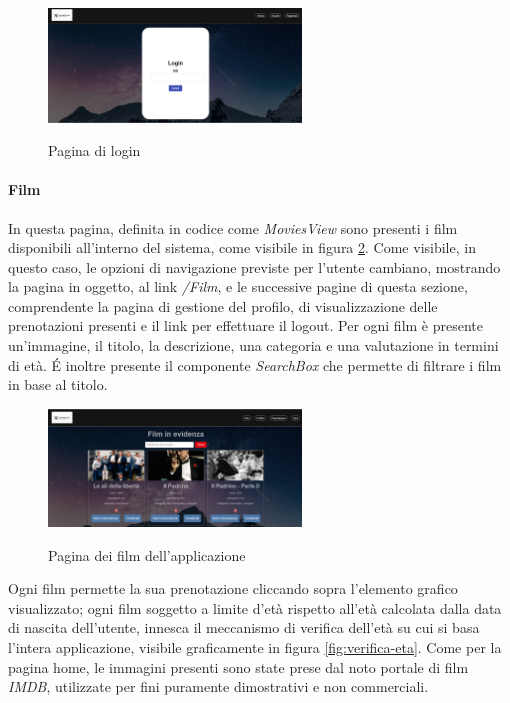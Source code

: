 \begin{figure}[h]
    \centering
    \includegraphics[width=0.6\textwidth, alt={Pagina di accesso all'applicazione}]{immagini/frontend/login.png}
    \caption{Pagina di login}\label{fig:pagina-login}
\end{figure}

\paragraph{Film}

In questa pagina, definita in codice come \textit{MoviesView} sono presenti i film disponibili all'interno del sistema, come visibile in figura \ref{fig:pagina-film}.
Come visibile, in questo caso, le opzioni di navigazione previste per l'utente cambiano, mostrando la pagina in oggetto, al link \textit{/Film},
e le successive pagine di questa sezione, comprendente la pagina di gestione del profilo, di visualizzazione delle prenotazioni presenti e il link per effettuare il logout.
Per ogni film è presente un'immagine, il titolo, la descrizione, una categoria e una valutazione in termini di età.
É inoltre presente il componente \textit{SearchBox} che permette di filtrare i film in base al titolo.
\begin{figure}[h]
    \centering
    \includegraphics[width=0.6\textwidth, alt={Pagina contenente i film dell'applicazione}]{immagini/frontend/movies.png}
    \caption{Pagina dei film dell'applicazione}\label{fig:pagina-film}
\end{figure}

Ogni film permette la sua prenotazione cliccando sopra l'elemento grafico visualizzato; ogni film soggetto a limite d'età rispetto all'età
calcolata dalla data di nascita dell'utente, innesca il meccanismo di verifica dell'età su cui si basa l'intera applicazione, visibile graficamente
in figura \ref{fig:verifica-eta}.
Come per la pagina home, le immagini presenti sono state prese dal noto portale di film \textit{IMDB}, utilizzate per fini puramente dimostrativi e non commerciali.

